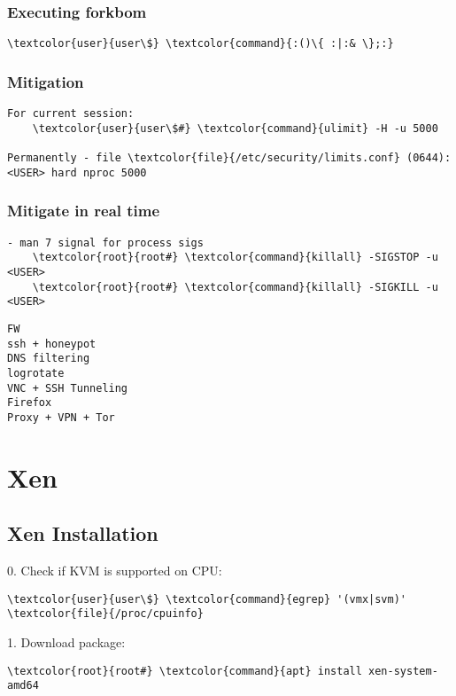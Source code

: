 \documentclass[10pt, a4paper, onecolumn, openany]{book} %
\begin{document}
\subsection{Executing forkbom}
\begin{Verbatim}[commandchars=\\\{\}]
    \textcolor{user}{user\$} \textcolor{command}{:()\{ :|:& \};:}
\end{Verbatim}
\subsection{Mitigation}
\begin{Verbatim}[commandchars=\\\{\}]
For current session:
    \textcolor{user}{user\$#} \textcolor{command}{ulimit} -H -u 5000

Permanently - file \textcolor{file}{/etc/security/limits.conf} (0644):
<USER> hard nproc 5000
\end{Verbatim}
\subsection{Mitigate in real time}
\begin{Verbatim}[commandchars=\\\{\}]
- man 7 signal for process sigs
    \textcolor{root}{root#} \textcolor{command}{killall} -SIGSTOP -u <USER>
    \textcolor{root}{root#} \textcolor{command}{killall} -SIGKILL -u <USER>
\end{Verbatim}

\begin{Verbatim}[commandchars=\\\{\}]
FW
ssh + honeypot
DNS filtering
logrotate
VNC + SSH Tunneling
Firefox
Proxy + VPN + Tor
\end{Verbatim}



\chapter{Xen}
\section{Xen Installation}
0. Check if KVM is supported on CPU:
\begin{Verbatim}[commandchars=\\\{\}]
    \textcolor{user}{user\$} \textcolor{command}{egrep} '(vmx|svm)' \textcolor{file}{/proc/cpuinfo}
\end{Verbatim}
1. Download package:
\begin{Verbatim}[commandchars=\\\{\}]
    \textcolor{root}{root#} \textcolor{command}{apt} install xen-system-amd64
\end{Verbatim}
\end{document}
